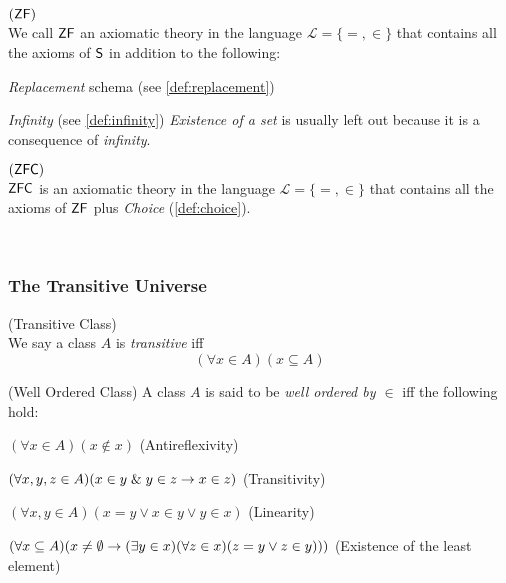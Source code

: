 \begin{definition}{$(\sf{ZF})$}\label{def:zf}\\ %
We call $\sf{ZF}$ an axiomatic theory in the language $\mathscr{L} = \{=, \in\}$ that contains all the axioms of $\sf{S}$ in addition to the following:
\bce[(i)]
\item \emph{Replacement} schema (see \ref{def:replacement})
\item \emph{Infinity} (see \ref{def:infinity})
\ece
\emph{Existence of a set} is usually left out because it is a consequence of \emph{infinity}.
\end{definition}

\begin{definition}{$(\sf{ZFC})$}\label{def:zfc}\\ %
$\sf{ZFC}$ is an axiomatic theory in the language $\mathscr{L} = \{=, \in\}$ that contains all the axioms of $\sf{ZF}$ plus \emph{Choice} (\ref{def:choice}).
\end{definition}

\

\subsubsection{The Transitive Universe}
\begin{definition}{(Transitive Class)}\label{def:transitivity}\\ %
We say a class $A$ is \emph{transitive} iff
\begin{equation}
(\forall x \in A)(x \subseteq A)
\end{equation}
\end{definition}

\begin{definition}{(Well Ordered Class)}\label{def:well_ordering} %
A class $A$ is said to be \emph{well ordered by $\in$} iff the following hold:
\bce[(i)]
\item $(\forall x \in A)(x \not\in x)$ (Antireflexivity)
\item $(\forall x, y, z \in A)(x \in y \mathrel{\&} y \in z \rightarrow x \in z)$ (Transitivity)
\item $(\forall x, y \in A)(x = y \lor x \in y \lor y \in x)$ (Linearity)
\item $(\forall x \subseteq A)(x \neq \emptyset \rightarrow (\exists y \in x)(\forall z \in x)(z = y \lor z \in y)))$ (Existence of the least element)
\ece
\end{definition}

